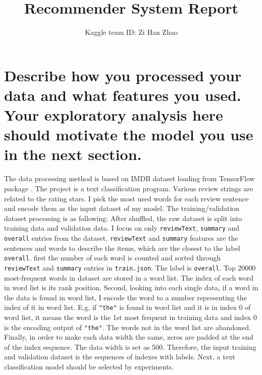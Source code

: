 \documentclass[12pt]{article}
\author{Kaggle team ID: Zi Han Zhao}
\affil{Student ID: zhaozih3}
\title{Recommender System Report}
\date{}
\begin{document}
\maketitle
\section{Describe how you processed your data and what features you used. Your exploratory analysis
here should motivate the model you use in the next section.}
The data processing method is based on IMDB dataset loading from TensorFlow package \cite{imdb}.
The project is a text classification program. Various review strings are related to the rating stars. 
I pick the most used words for each review sentence
and encode them as the input dataset of my model.
The training/validation dataset processing is as following: 
After shuffled, the raw dataset is split into training data and validation data.
 I focus on only \texttt{reviewText},
\texttt{summary} and \texttt{overall} entries from the dataset. \texttt{reviewText} and 
\texttt{summary} features are the sentences
and words to describe the items, which are the closest to the label \texttt{overall}. 
first the number of each word is counted and sorted 
through \texttt{reviewText} and
\texttt{summary} entries in \texttt{train.json}. The label is \texttt{overall}. 
Top 20000 most-frequent words in dataset are stored in a word list.
The index of each word in word list is its rank position.
Second, looking into each single data, if a word in the data is found in word list, I
encode the word to a number representing the index of it in word list. E.g, if \texttt{"the"} is found in word list
and it is in index 0 of word list, it means the word is the 1st most frequent in training data and index 0
is the encoding output of \texttt{"the"}. The words not in the word list are abandoned. Finally,
in order to make each data width the same, zeros are padded at the end of the index sequence. The data width is set as 500. Therefore, the input training and validation dataset is the sequences of indexes with labels.
Next, a text classification model should be selected by experiments.
\end{document}
